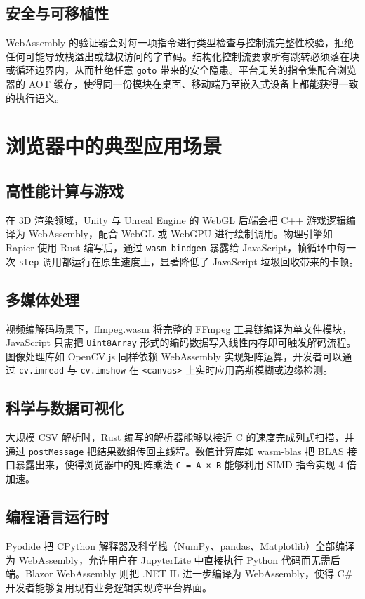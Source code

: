 \section{安全与可移植性}
WebAssembly 的验证器会对每一项指令进行类型检查与控制流完整性校验，拒绝任何可能导致栈溢出或越权访问的字节码。结构化控制流要求所有跳转必须落在块或循环边界内，从而杜绝任意 \texttt{goto} 带来的安全隐患。平台无关的指令集配合浏览器的 AOT 缓存，使得同一份模块在桌面、移动端乃至嵌入式设备上都能获得一致的执行语义。\par
\chapter{浏览器中的典型应用场景}
\section{高性能计算与游戏}
在 3D 渲染领域，Unity 与 Unreal Engine 的 WebGL 后端会把 C++ 游戏逻辑编译为 WebAssembly，配合 WebGL 或 WebGPU 进行绘制调用。物理引擎如 Rapier 使用 Rust 编写后，通过 \texttt{wasm-bindgen} 暴露给 JavaScript，帧循环中每一次 \texttt{step} 调用都运行在原生速度上，显著降低了 JavaScript 垃圾回收带来的卡顿。\par
\section{多媒体处理}
视频编解码场景下，ffmpeg.wasm 将完整的 FFmpeg 工具链编译为单文件模块，JavaScript 只需把 \texttt{Uint8Array} 形式的编码数据写入线性内存即可触发解码流程。图像处理库如 OpenCV.js 同样依赖 WebAssembly 实现矩阵运算，开发者可以通过 \texttt{cv.imread} 与 \texttt{cv.imshow} 在 \texttt{<canvas>} 上实时应用高斯模糊或边缘检测。\par
\section{科学与数据可视化}
大规模 CSV 解析时，Rust 编写的解析器能够以接近 C 的速度完成列式扫描，并通过 \texttt{postMessage} 把结果数组传回主线程。数值计算库如 wasm-blas 把 BLAS 接口暴露出来，使得浏览器中的矩阵乘法 \texttt{C = A × B} 能够利用 SIMD 指令实现 4 倍加速。\par
\section{编程语言运行时}
Pyodide 把 CPython 解释器及科学栈（NumPy、pandas、Matplotlib）全部编译为 WebAssembly，允许用户在 JupyterLite 中直接执行 Python 代码而无需后端。Blazor WebAssembly 则把 .NET IL 进一步编译为 WebAssembly，使得 C\#{} 开发者能够复用现有业务逻辑实现跨平台界面。\par
